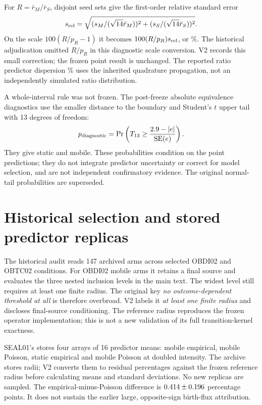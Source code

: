 \documentclass[11pt]{article}
\begin{document}
For $R=\bar r_M/\bar r_S$, disjoint seed sets give the first-order relative standard error
\[
 s_{\rm rel}=\sqrt{(s_M/(\sqrt{14}\bar r_M))^2+
                       (s_S/(\sqrt{14}\bar r_S))^2}.
\]
On the scale $100(R/p_R-1)$ it becomes $100(R/p_R)s_{\rm rel}$, or \VRatioSE\%.
The historical adjudication omitted $R/p_R$ in this diagnostic scale conversion.
V2 records this small correction; the frozen point result is unchanged.
The reported ratio predictor dispersion \VRatioMCSD\% uses the inherited quadrature
propagation, not an independently simulated ratio distribution.

A whole-interval rule was not frozen. The post-freeze absolute equivalence diagnostics
use the smaller distance to the boundary and Student's $t$ upper tail with 13 degrees of freedom:
\[
 p_{\rm diagnostic}=
 {\Pr}\left(T_{13}\ge\frac{2.9-|e|}{\mathrm{SE}(e)}\right).
\]
They give \VStaticTOST{} static and \VMobileTOST{} mobile.
These probabilities condition on the point predictions; they do not integrate predictor
uncertainty or correct for model selection, and are not independent confirmatory evidence.
The original normal-tail probabilities are superseded.

\section{Historical selection and stored predictor replicas}
The historical audit reads 147 archived arms across selected OBDI02 and OBTC02 conditions.
For OBDI02 mobile arms it retains a final source and evaluates the three nested inclusion
levels in the main text. The widest level still requires at least one finite radius.
The original key \emph{no outcome-dependent threshold at all} is therefore overbroad.
V2 labels it \emph{at least one finite radius} and discloses final-source conditioning.
The reference radius reproduces the frozen operator implementation; this is not a new
validation of its full transition-kernel exactness.

SEAL01's  stores four arrays of 16 predictor means:
mobile empirical, mobile Poisson, static empirical and mobile Poisson at doubled intensity.
The archive stores radii; V2 converts them to residual percentages against the frozen
reference radius before calculating means and standard deviations.
No new replicas are sampled.
The empirical-minus-Poisson difference is $0.414\pm0.196$ percentage points.
It does not sustain the earlier large, opposite-sign birth-flux attribution.
\end{document}
